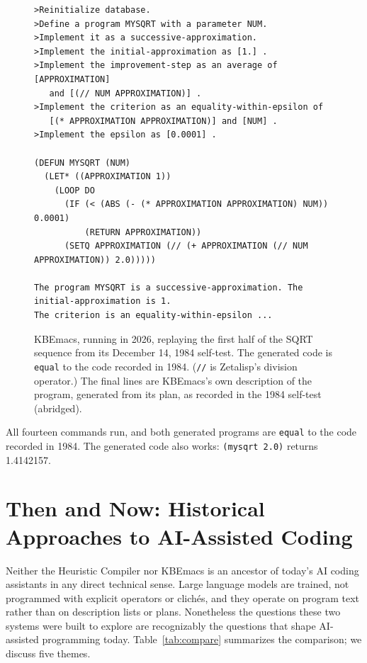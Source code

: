 \documentclass[11pt]{article}
\begin{document}
\begin{figure}[H]
\begin{lstlisting}
>Reinitialize database.
>Define a program MYSQRT with a parameter NUM.
>Implement it as a successive-approximation.
>Implement the initial-approximation as [1.] .
>Implement the improvement-step as an average of [APPROXIMATION]
   and [(// NUM APPROXIMATION)] .
>Implement the criterion as an equality-within-epsilon of
   [(* APPROXIMATION APPROXIMATION)] and [NUM] .
>Implement the epsilon as [0.0001] .

(DEFUN MYSQRT (NUM)
  (LET* ((APPROXIMATION 1))
    (LOOP DO
      (IF (< (ABS (- (* APPROXIMATION APPROXIMATION) NUM)) 0.0001)
          (RETURN APPROXIMATION))
      (SETQ APPROXIMATION (// (+ APPROXIMATION (// NUM APPROXIMATION)) 2.0)))))

The program MYSQRT is a successive-approximation. The initial-approximation is 1.
The criterion is an equality-within-epsilon ...
\end{lstlisting}
\caption{KBEmacs, running in 2026, replaying the first half of the SQRT
sequence from its December 14, 1984 self-test. The generated code is
\texttt{equal} to the code recorded in 1984. (\texttt{//} is Zetalisp's
division operator.) The final lines are KBEmacs's own description of
the program, generated from its plan, as recorded in the 1984
self-test (abridged).}
\label{fig:sqrt}
\end{figure}

All fourteen commands run, and both generated programs are
\texttt{equal} to the code recorded in 1984. The generated code also
works: \texttt{(mysqrt 2.0)} returns 1.4142157.

\section{Then and Now: Historical Approaches to AI-Assisted Coding}
\label{sec:thenandnow}

Neither the Heuristic Compiler nor KBEmacs is an ancestor of today's AI
coding assistants in any direct technical sense. Large language models
are trained, not programmed with explicit operators or clich\'es, and
they operate on program text rather than on description lists or plans.
Nonetheless the questions these two systems were built to
explore are recognizably the questions that shape AI-assisted
programming today.
Table~\ref{tab:compare} summarizes the comparison; we discuss five
themes.
\end{document}

